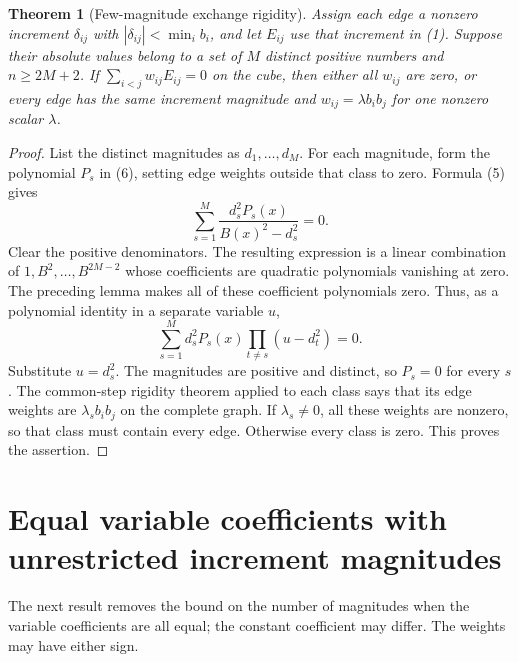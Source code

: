 \documentclass[11pt]{article}
\newtheorem{theorem}{Theorem}
\begin{document}
\begin{theorem}[Few-magnitude exchange rigidity]
Assign each edge a nonzero increment $\delta_{ij}$ with
$|\delta_{ij}|<\min_i b_i$, and let $E_{ij}$ use that increment
in (1). Suppose their absolute values belong to a set of $M$
distinct positive numbers and $n\ge2M+2$. If
$\sum_{i<j}w_{ij}E_{ij}=0$ on the cube, then either all $w_{ij}$
are zero, or every edge has the same increment magnitude and
$w_{ij}=\lambda b_i b_j$ for one nonzero scalar $\lambda$.
\end{theorem}
\begin{proof}
List the distinct magnitudes as $d_1,\ldots,d_M$. For each
magnitude, form the polynomial $P_s$ in (6), setting edge weights
outside that class to zero. Formula (5) gives
\[
             \sum_{s=1}^M\frac{d_s^2 P_s(x)}{B(x)^2-d_s^2}=0.
 \tag{13}
\]
Clear the positive denominators. The resulting expression is a
linear combination of $1,B^2,\ldots,B^{2M-2}$ whose coefficients
are quadratic polynomials vanishing at zero. The preceding lemma
makes all of these coefficient polynomials zero. Thus, as a
polynomial identity in a separate variable $u$,
\[
       \sum_{s=1}^M d_s^2 P_s(x)
                         \prod_{t\ne s}(u-d_t^2)=0.
 \tag{14}
\]
Substitute $u=d_s^2$. The magnitudes are positive and distinct,
so $P_s=0$ for every $s$. The common-step rigidity theorem
applied to each class says that its edge weights are
$\lambda_s b_i b_j$ on the complete graph. If $\lambda_s\ne0$,
all these weights are nonzero, so that class must contain every
edge. Otherwise every class is zero. This proves the assertion.
\end{proof}

\section{Equal variable coefficients with unrestricted increment magnitudes}

The next result removes the bound on the number of magnitudes when the
variable coefficients are all equal; the constant coefficient may differ.
The weights may have either sign.
\end{document}
